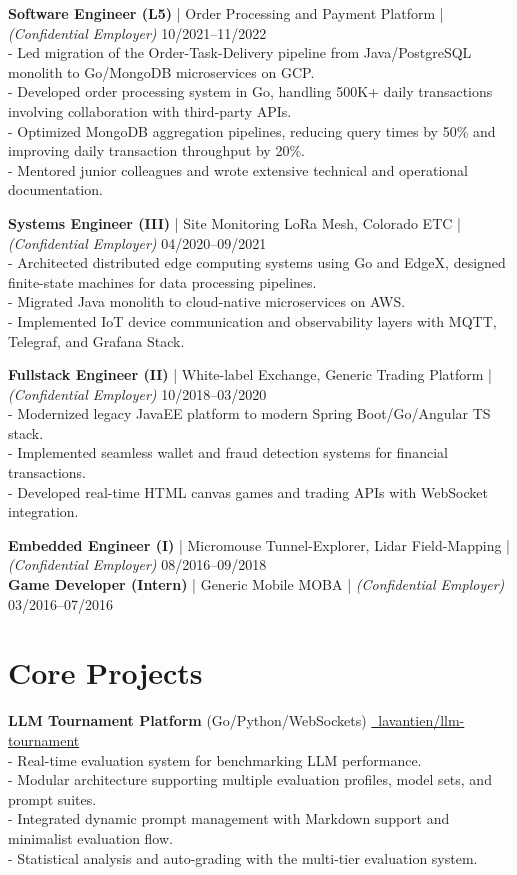 \documentclass[10pt, a4paper]{article}
\begin{document}
\textbf{Software Engineer (L5)} | Order Processing and Payment Platform | \textit{(Confidential Employer)} \hfill 10/2021--11/2022 \\
- Led migration of the Order-Task-Delivery pipeline from Java/PostgreSQL monolith to Go/MongoDB microservices on GCP. \\
- Developed order processing system in Go, handling 500K+ daily transactions involving collaboration with third-party APIs.\\
- Optimized MongoDB aggregation pipelines, reducing query times by 50\% and improving daily transaction throughput by 20\%. \\
- Mentored junior colleagues and wrote extensive technical and operational documentation.

\textbf{Systems Engineer (III)} | Site Monitoring LoRa Mesh, Colorado ETC | \textit{(Confidential Employer)} \hfill 04/2020--09/2021 \\
- Architected distributed edge computing systems using Go and EdgeX, designed finite-state machines for data processing pipelines. \\
- Migrated Java monolith to cloud-native microservices on AWS. \\
- Implemented IoT device communication and observability layers with MQTT, Telegraf, and Grafana Stack.

\textbf{Fullstack Engineer (II)} | White-label Exchange, Generic Trading Platform | \textit{(Confidential Employer)} \hfill 10/2018--03/2020 \\
- Modernized legacy JavaEE platform to modern Spring Boot/Go/Angular TS stack. \\
- Implemented seamless wallet and fraud detection systems for financial transactions.  \\
- Developed real-time HTML canvas games and trading APIs with WebSocket integration.

\textbf{Embedded Engineer (I)} | Micromouse Tunnel-Explorer, Lidar Field-Mapping | \textit{(Confidential Employer)} \hfill 08/2016--09/2018 \\
\textbf{Game Developer (Intern)} | Generic Mobile MOBA | \textit{(Confidential Employer)} \hfill 03/2016--07/2016

\section*{Core Projects}
\textbf{LLM Tournament Platform} (Go/Python/WebSockets) \hfill \href{https://github.com/lavantien/llm-tournament}{\faGithub\ lavantien/llm-tournament} \\
- Real-time evaluation system for benchmarking LLM performance. \\
- Modular architecture supporting multiple evaluation profiles, model sets, and prompt suites. \\
- Integrated dynamic prompt management with Markdown support and minimalist evaluation flow. \\
- Statistical analysis and auto-grading with the multi-tier evaluation system.
\end{document}
